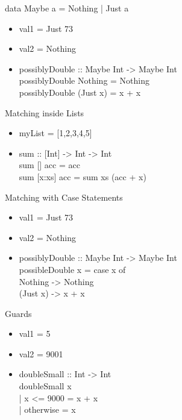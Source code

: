 \documentclass{beamer}                  %
\newcommand{\srule}{
	\rule{\textwidth}{1pt}\\
}
\newlength{\subsecwidth}
\newenvironment{slide}{
	\begin{frame} %
	\settowidth{\subsecwidth}{\insertsubsection} %
	\ifthenelse{\dimtest{\subsecwidth}{<}{1pt}}{ %
		\frametitle{\insertsection\\             %
		\vspace{-1ex}                            %
		\color{fore}\srule                       %
		\par                                     %
		\vspace{-3ex}                            %
		}
	}{                                           %
		\frametitle{\insertsection\ -- \insertsubsection\\ %
		\vspace{-1ex}                            %
		\color{fore}\srule                       %
		\par                                     %
		\vspace{-3ex}                            %
		}
	}
	\Large                                       %
}{
	\end{frame}
}
\begin{document}
\begin{slide}
  data Maybe a = Nothing | Just a
  \begin{itemize}
    \item val1 = Just 73
    \item val2 = Nothing
    \item possiblyDouble :: Maybe Int -> Maybe Int\\
      possiblyDouble Nothing = Nothing\\
      possiblyDouble (Just x) = x + x
  \end{itemize}
\end{slide}

\begin{slide}
  Matching inside Lists
  \begin{itemize}
    \item myList = [1,2,3,4,5]
    \item sum :: [Int] -> Int -> Int\\
          sum [] acc     = acc\\
          sum [x:xs] acc = sum xs (acc + x)
  \end{itemize}
\end{slide}

\begin{slide}
  Matching with Case Statements
  \begin{itemize}
    \item val1 = Just 73
    \item val2 = Nothing
    \item possiblyDouble :: Maybe Int -> Maybe Int\\
      possibleDouble x = case x of\\
      Nothing -> Nothing\\
      (Just x) -> x + x
  \end{itemize}
\end{slide}

\begin{slide}
  Guards
  \begin{itemize}
    \item val1 = 5
    \item val2 = 9001
    \item doubleSmall :: Int -> Int\\
      doubleSmall x\\
      | x <= 9000 = x + x\\
      | otherwise = x
  \end{itemize}
\end{slide}
\end{document}
